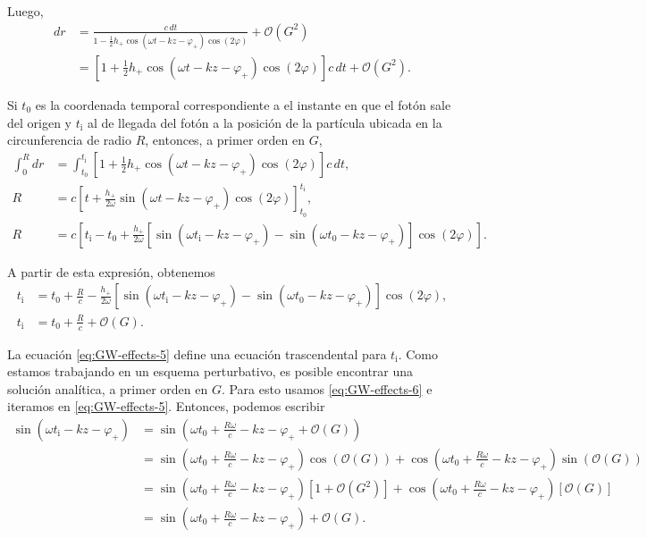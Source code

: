 \documentclass[letterpaper,11pt]{article}
\begin{document}
Luego,
\begin{align}
dr &= \frac{c\,dt}{1 - \frac{1}{2} h_{+} \cos(\omega t -kz - \varphi_{+})\cos(2\varphi)} + \mathcal{O}(G^2) \nonumber \\
&= \left[1 + \frac{1}{2} h_{+} \cos(\omega t -kz - \varphi_{+})\cos(2\varphi) \right] c\,dt + \mathcal{O}(G^2). \label{eq:GW-effects-4.5}
\end{align}

Si $t_0$ es la coordenada temporal correspondiente a el instante en que el fotón sale del origen y $t_{\text{i}}$ al de llegada del fotón a la posición de la partícula ubicada en la circunferencia de radio $R$, entonces, a primer orden en $G$,
\begin{align}
\int_0^R dr &= \int_{t_0}^{t_{\text{i}}} \left[1 + \frac{1}{2} h_{+} \cos(\omega t -kz - \varphi_{+})\cos(2\varphi) \right] c \,dt, \\
R &= c \left[t + \frac{h_{+}}{2\omega}  \sin(\omega t -kz - \varphi_{+})\cos(2\varphi)\right]_{t_0}^{t_{\text{i}}}, \\
R &= c \left[t_{\text{i}} - t_{0} + \frac{h_{+}}{2\omega}\left[\sin(\omega t_{\text{i}} -kz - \varphi_{+}) - \sin(\omega t_{0} -kz - \varphi_{+})\right]\cos(2\varphi)\right].
\end{align}

A partir de esta expresión, obtenemos
\begin{align}
t_{\text{i}} &= t_0 + \frac{R}{c} - \frac{h_{+}}{2\omega}\left[\sin(\omega t_{\text{i}} -kz - \varphi_{+}) - \sin(\omega t_{0} -kz - \varphi_{+})\right]\cos(2\varphi),  \label{eq:GW-effects-5} \\
t_{\text{i}} &= t_0 + \frac{R}{c} + \mathcal{O}(G).  \label{eq:GW-effects-6}
\end{align}

La ecuación \eqref{eq:GW-effects-5} define una ecuación trascendental para $t_{\text{i}}$. Como estamos trabajando en un esquema perturbativo, es posible encontrar una solución analítica, a primer orden en $G$. Para esto usamos \eqref{eq:GW-effects-6} e iteramos en \eqref{eq:GW-effects-5}. Entonces, podemos escribir
\begin{align}
\sin(\omega t_{\text{i}} -kz - \varphi_{+}) &= \sin\left(\omega t_0 + \frac{R\omega}{c} - kz - \varphi_{+} + \mathcal{O}(G) \right) \nonumber \\
&= \sin\left(\omega t_0 + \frac{R\omega}{c} -kz - \varphi_{+}\right) \cos(\mathcal{O}(G) ) + \cos\left(\omega t_0 + \frac{R\omega}{c} -kz - \varphi_{+}\right) \sin(\mathcal{O}(G) ) \nonumber \\
&= \sin\left(\omega t_0 + \frac{R\omega}{c} -kz - \varphi_{+}\right) \left[1 + \mathcal{O}(G^2) \right] + \cos\left(\omega t_0 + \frac{R\omega}{c} -kz - \varphi_{+}\right) \left[ \mathcal{O}(G) \right]\nonumber \\
&= \sin\left(\omega t_0 + \frac{R\omega}{c} -kz - \varphi_{+}\right) + \mathcal{O}(G).
\end{align}
\end{document}
